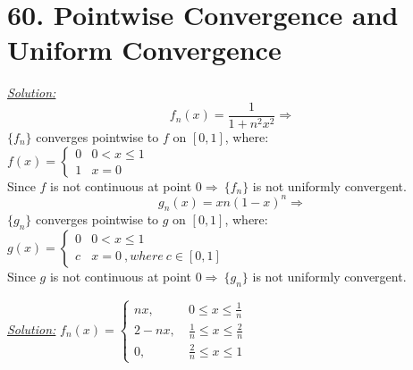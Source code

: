 \documentclass{book}
\begin{document}
\section{60. Pointwise Convergence and Uniform Convergence}
\begin{tcolorbox}[enhanced,attach boxed title to top center={yshift=-3mm,yshifttext=-1mm},
colback=blue!5!white,colframe=blue!75!black,colbacktitle=red!80!black,
title=Exercise 60.2:,fonttitle=\bfseries,
boxed title style={size=small,colframe=red!50!black} ]
\textit{\color{blue}\underline{Solution:}}
$$f_n (x)=\frac{1}{1+n^2 x^2}\Longrightarrow$$
$\{f_n\}$ converges pointwise to $f$ on $[0,1]$, where:\\
$f(x)=\begin{cases}
0 & 0< x \leq 1\\
1 & x=0
\end{cases}$\\
Since $f$ is not continuous at point $0\Rightarrow~\{f_n\}$ is not uniformly convergent.
\noindent{\color{blue}\rule{\linewidth}{.3mm}}\\
$$g_n (x)=xn(1-x)^n\Longrightarrow$$
$\{g_n\}$ converges pointwise to $g$ on $[0,1]$, where:\\
$g(x)=\begin{cases}
0 & 0< x \leq 1\\
c & x=0 ~,where~c\in[0,1]
\end{cases}$\\
Since $g$ is not continuous at point $0\Rightarrow~\{g_n\}$ is not uniformly convergent.
\end{tcolorbox}
\begin{tcolorbox}[enhanced,attach boxed title to top center={yshift=-3mm,yshifttext=-1mm},
colback=blue!5!white,colframe=blue!75!black,colbacktitle=red!80!black,
title=Exercise 60.4:,fonttitle=\bfseries,
boxed title style={size=small,colframe=red!50!black} ]
\textit{\color{blue}\underline{Solution:}}
$f_n(x)=\begin{cases}
nx,~&0\leq x\leq\frac{1}{n}\\
2-nx,~&\frac{1}{n}\leq x\leq \frac{2}{n}\\
0,~&\frac{2}{n}\leq x\leq 1
\end{cases}$
\end{tcolorbox}
\end{document}
